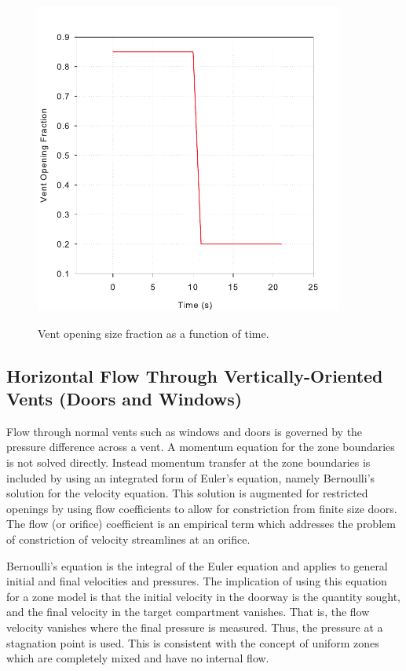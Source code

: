\begin{figure}[t]
\begin{center}
\includegraphics[width=4.0in]{FIGURES/Theory/Opening_Fraction}\\
\end{center}
\caption{Vent opening size fraction as a function of time.}
 \label{fig:Opening_Fraction}
\end{figure}

\subsection{Horizontal Flow Through Vertically-Oriented Vents (Doors and Windows)}

Flow through normal vents such as windows and doors is governed by the pressure difference across a vent.  A momentum equation for the zone boundaries is not solved directly.  Instead momentum transfer at the zone boundaries is included by using an integrated form of Euler's equation, namely Bernoulli's solution for the velocity equation.  This solution is augmented for restricted openings by using flow coefficients \cite{Quintiere:1984, Steckler_Coefficients} to allow for constriction from finite size doors.  The flow (or orifice) coefficient is an empirical term which addresses the problem of constriction of velocity streamlines at an orifice.

Bernoulli's equation is the integral of the Euler equation and applies to general initial and final velocities and pressures.  The implication of using this equation for a zone model is that the initial velocity in the doorway is the quantity sought, and the final velocity in the target compartment vanishes.  That is, the flow velocity vanishes where the final pressure is measured.  Thus, the pressure at a stagnation point is used.  This is consistent with the concept of uniform zones which are completely mixed and have no internal flow.

